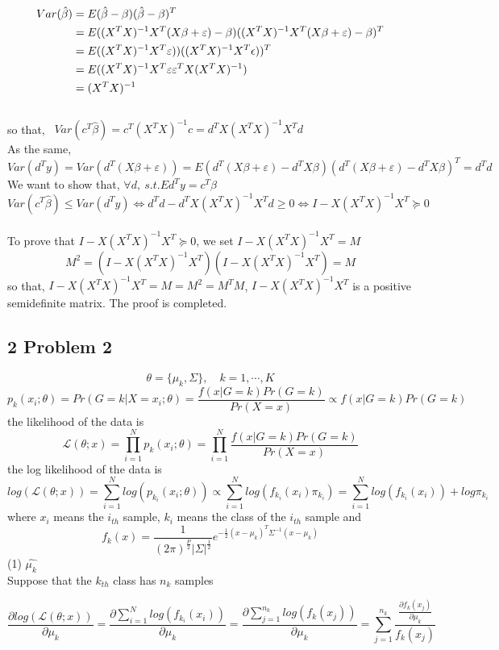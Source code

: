 \documentclass[10pt,a4paper]{article}
\begin{document}
\begin{align}
Var(\hat{\beta})
& = E(\hat{\beta}-\beta)(\hat{\beta}-\beta)^T \notag \\
& = E((X^TX)^{-1}X^T(X\beta+\varepsilon)-\beta)((X^TX)^{-1}X^T(X\beta+\varepsilon)-\beta)^T \notag \\
& = E((X^TX)^{-1}X^T\varepsilon))((X^TX)^{-1}X^T\epsilon))^T \notag \\
& = E((X^TX)^{-1}X^T\varepsilon\varepsilon^T X (X^TX)^{-1}) \notag \\
& = (X^TX)^{-1} \notag 
\end{align}
\\
so that, \ $Var(c^T\hat{\beta}) = c^T(X^TX)^{-1}c = d^TX(X^TX)^{-1}X^Td$ \\
As the same, \  $Var(d^Ty) = Var(d^T(X\beta+\varepsilon))=E(d^T(X\beta+\varepsilon)-d^TX\beta)(d^T(X\beta+\varepsilon)-d^TX\beta)^T=d^Td$ \\
We want to show that, $\forall d, \  s.t. Ed^Ty=c^T\beta$ \\
$$ Var(c^T\hat{\beta}) \leq Var(d^Ty) \iff d^Td - d^TX(X^TX)^{-1}X^Td \geq 0 \iff I-X(X^TX)^{-1}X^T \succeq 0 $$
\\
To prove that $I-X(X^TX)^{-1}X^T \succeq 0$, we set $I-X(X^TX)^{-1}X^T = M$
$$ M^2= (I-X(X^TX)^{-1}X^T)(I-X(X^TX)^{-1}X^T)=M $$ 
so that, $I-X(X^TX)^{-1}X^T=M=M^2=M^TM$, $I-X(X^TX)^{-1}X^T$ is a positive semidefinite matrix. The proof is completed.



\subsection{2 Problem 2}
$$\theta=\{\mu_{k},\Sigma \} ,\quad   k=1, \cdots, K $$
$$p_{k}(x_{i};\theta)=Pr(G=k|X=x_{i};\theta)=\frac{f(x|G=k)Pr(G=k)}{Pr(X=x)}\propto f(x|G=k)Pr(G=k) $$
the likelihood of the data is
$$ \mathcal{L}(\theta;x)=\prod_{i=1}^N p_{k}(x_{i};\theta)=\prod_{i=1}^N \frac{f(x|G=k)Pr(G=k)}{Pr(X=x)} $$
the log likelihood of the data is
$$ log(\mathcal{L}(\theta;x))=\sum_{i=1}^{N}log(p_{k_{i}}(x_i;\theta))\propto \sum_{i=1}^{N}log(f_{k_{i}}(x_i)\pi_{k_i})=\sum_{i=1}^{N}log(f_{k_{i}}(x_i))+log\pi_{k_i} $$
where  $x_i$ means the $i_{th}$ sample, $k_i$ means the class of the $i_{th}$ sample and
$$ f_{k}(x)=\frac{1}{(2\pi)^\frac{P}{2}{|\Sigma|}^\frac{1}{2}}e^{-\frac{1}{2}(x-\mu_{k})^T\Sigma^{-1}(x-\mu_{k})} $$
(1) $\hat{\mu_{k}}$\\
Suppose that the $k_{th}$ class has $n_k$ samples

\[
	\frac{\partial log(\mathcal{L}(\theta;x))}{\partial \mu_{k}} = \frac{\partial \sum_{i=1}^{N}log(f_{k_{i}}(x_i))}{\partial \mu_{k}}=\frac{\partial \sum_{j=1}^{n_k}log(f_{k}(x_j))}{\partial \mu_{k}}=\sum_{j=1}^{n_k}\frac{\frac{\partial f_{k}(x_j)}{\partial \mu_{k}}}{f_{k}(x_j)} 
	\tag{1}
\]
\end{document}
